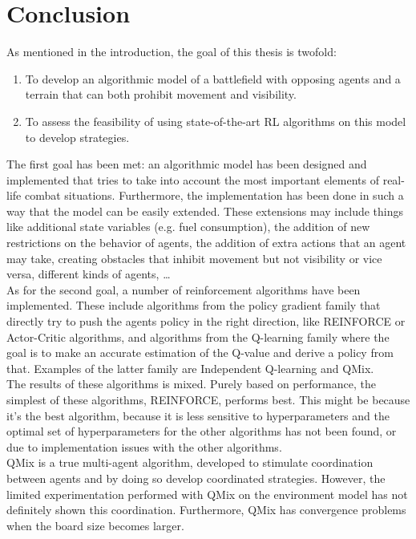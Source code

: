 \chapter{Conclusion}
\label{ch:conclusion}
As mentioned in the introduction, the goal of this thesis is twofold:
\begin{enumerate}
    \item To develop an algorithmic model of a battlefield with opposing agents and a terrain that can both prohibit movement and visibility.
    \item To assess the feasibility of using state-of-the-art RL algorithms on this model to develop strategies.
\end{enumerate}
The first goal has been met: an algorithmic model has been designed and implemented that tries to take into account the most important elements of real-life combat situations. Furthermore, the implementation has been done in such a way that the model can be easily extended. These extensions may include things like additional state variables (e.g. fuel consumption), the addition of new restrictions on the behavior of agents, the addition of extra actions that an agent may take, creating obstacles that inhibit movement but not visibility or vice versa, different kinds of agents, \ldots\\
As for the second goal, a number of reinforcement algorithms have been implemented. These include algorithms from the policy gradient family that directly try to push the agents policy in the right direction, like REINFORCE or Actor-Critic algorithms, and algorithms from the Q-learning family where the goal is to make an accurate estimation of the Q-value and derive a policy from that. Examples of the latter family are Independent Q-learning and QMix.\\
The results of these algorithms is mixed. Purely based on performance, the simplest of these algorithms, REINFORCE, performs best. This might be because it's the best algorithm, because it is less sensitive to hyperparameters and the optimal set of hyperparameters for the other algorithms has not been found, or due to implementation issues with the other algorithms.\\
QMix is a true multi-agent algorithm, developed to stimulate coordination between agents and by doing so develop coordinated strategies. However, the limited experimentation performed with QMix on the environment model has not definitely shown this coordination. Furthermore, QMix has convergence problems when the board size becomes larger.\\
